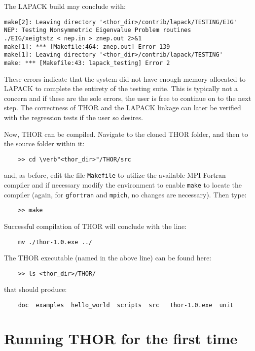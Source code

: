 The \ac{LAPACK} build may conclude with:
\begin{verbatim}
make[2]: Leaving directory '<thor_dir>/contrib/lapack/TESTING/EIG'
NEP: Testing Nonsymmetric Eigenvalue Problem routines
./EIG/xeigtstz < nep.in > znep.out 2>&1
make[1]: *** [Makefile:464: znep.out] Error 139
make[1]: Leaving directory '<thor_dir>/contrib/lapack/TESTING'
make: *** [Makefile:43: lapack_testing] Error 2
\end{verbatim}
These errors indicate that the system did not have enough memory allocated to \ac{LAPACK} to complete the entirety of the testing suite.
This is typically not a concern and if these are the sole errors, the user is free to continue on to the next step.
The correctness of \ac{THOR} and the \ac{LAPACK} linkage can later be verified with the regression tests if the user so desires.

Now, \ac{THOR} can be compiled. Navigate to the cloned \ac{THOR} folder, and then to the source folder within it:
\begin{verbatim}
    >> cd \verb"<thor_dir>"/THOR/src
\end{verbatim}
and, as before, edit the file \verb"Makefile" to utilize the available MPI Fortran compiler and if necessary modify the environment to enable \verb"make" to locate the compiler (again, for {\tt gfortran} and {\tt mpich}, no changes are necessary).
Then type:
\begin{verbatim}
    >> make
\end{verbatim}
Successful compilation of \ac{THOR} will conclude with the line:
\begin{verbatim}
    mv ./thor-1.0.exe ../
\end{verbatim}
The \ac{THOR} executable (named in the above line) can be found here:
\begin{verbatim}
    >> ls <thor_dir>/THOR/
\end{verbatim}
that should produce:
\begin{verbatim}
    doc  examples  hello_world  scripts  src   thor-1.0.exe  unit
\end{verbatim}

\section{Running THOR for the first time}

